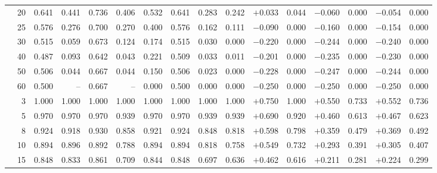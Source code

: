 \documentclass[conference]{IEEEtran}
\theoremstyle{remark}
\begin{document}
\begin{table}[t]
{\begin{tabular}{p{2.2cm}r rrrr rr rr rr rr rr}
  & 20 & 0.641 & 0.441 & 0.736 & 0.406 & 0.532 & 0.641 & 0.283 & 0.242 & $+$0.033 & 0.044 & $-$0.060 & 0.000 & $-$0.054 & 0.000 \\
  & 25 & 0.576 & 0.276 & 0.700 & 0.270 & 0.400 & 0.576 & 0.162 & 0.111 & $-$0.090 & 0.000 & $-$0.160 & 0.000 & $-$0.154 & 0.000 \\
  & 30 & 0.515 & 0.059 & 0.673 & 0.124 & 0.174 & 0.515 & 0.030 & 0.000 & $-$0.220 & 0.000 & $-$0.244 & 0.000 & $-$0.240 & 0.000 \\
  & 40 & 0.487 & 0.093 & 0.642 & 0.043 & 0.221 & 0.509 & 0.033 & 0.011 & $-$0.201 & 0.000 & $-$0.235 & 0.000 & $-$0.230 & 0.000 \\
  & 50 & 0.506 & 0.044 & 0.667 & 0.044 & 0.150 & 0.506 & 0.023 & 0.000 & $-$0.228 & 0.000 & $-$0.247 & 0.000 & $-$0.244 & 0.000 \\
  & 60 & 0.500 & -- & 0.667 & -- & 0.000 & 0.500 & 0.000 & 0.000 & $-$0.250 & 0.000 & $-$0.250 & 0.000 & $-$0.250 & 0.000 \\
\midrule
{}
  & 3  & 1.000 & 1.000 & 1.000 & 1.000 & 1.000 & 1.000 & 1.000 & 1.000 & $+$0.750 & 1.000 & $+$0.550 & 0.733 & $+$0.552 & 0.736 \\
  & 5  & 0.970 & 0.970 & 0.970 & 0.939 & 0.970 & 0.970 & 0.939 & 0.939 & $+$0.690 & 0.920 & $+$0.460 & 0.613 & $+$0.467 & 0.623 \\
  & 8  & 0.924 & 0.918 & 0.930 & 0.858 & 0.921 & 0.924 & 0.848 & 0.818 & $+$0.598 & 0.798 & $+$0.359 & 0.479 & $+$0.369 & 0.492 \\
  & 10 & 0.894 & 0.896 & 0.892 & 0.788 & 0.894 & 0.894 & 0.818 & 0.758 & $+$0.549 & 0.732 & $+$0.293 & 0.391 & $+$0.305 & 0.407 \\
  & 15 & 0.848 & 0.833 & 0.861 & 0.709 & 0.844 & 0.848 & 0.697 & 0.636 & $+$0.462 & 0.616 & $+$0.211 & 0.281 & $+$0.224 & 0.299 \\

\end{tabular}}
\end{table}
\end{document}
